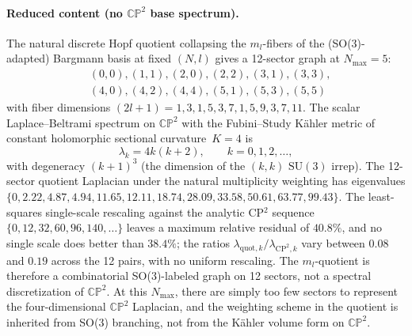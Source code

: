 \documentclass[twocolumn,pra,amsmath,amssymb,superscriptaddress]{revtex4-2}
\begin{document}
\paragraph{Reduced content (no $\mathbb{CP}^2$ base spectrum).}
The natural discrete Hopf quotient collapsing the $m_l$-fibers of
the (SO(3)-adapted) Bargmann basis at fixed $(N, l)$ gives a
12-sector graph at $N_{\max} = 5$:
\[
\begin{aligned}
& (0,0), (1,1), (2,0), (2,2), (3,1), (3,3), \\
& (4,0), (4,2), (4,4), (5,1), (5,3), (5,5)
\end{aligned}
\]
with fiber dimensions $(2l+1) = 1, 3, 1, 5, 3, 7, 1, 5, 9, 3, 7, 11$.
The scalar Laplace--Beltrami spectrum on $\mathbb{CP}^2$ with the
Fubini--Study K\"ahler metric of constant holomorphic sectional
curvature~$K = 4$ is~\cite{berger_gauduchon_mazet}
\begin{equation}
  \lambda_k = 4k(k+2),\qquad k = 0, 1, 2, \ldots,
\end{equation}
with degeneracy $(k+1)^3$ (the dimension of the $(k, k)$
$\mathrm{SU}(3)$ irrep).  The 12-sector quotient Laplacian under
the natural multiplicity weighting has eigenvalues
$\{0, 2.22, 4.87, 4.94, 11.65, 12.11, 18.74, 28.09, 33.58, 50.61,
63.77, 99.43\}$.  The least-squares single-scale rescaling against the
analytic CP$^2$ sequence $\{0, 12, 32, 60, 96, 140, \ldots\}$ leaves
a maximum relative residual of $40.8\%$, and no single scale does
better than $38.4\%$; the ratios
$\lambda_{\mathrm{quot},k}/\lambda_{\mathrm{CP}^2,k}$ vary between
$0.08$ and $0.19$ across the 12 pairs, with no uniform rescaling.
The $m_l$-quotient is therefore a combinatorial SO(3)-labeled graph
on 12 sectors, not a spectral discretization of $\mathbb{CP}^2$.
At this $N_{\max}$, there are simply too few sectors to represent
the four-dimensional $\mathbb{CP}^2$ Laplacian, and the weighting
scheme in the quotient is inherited from SO(3) branching, not from
the K\"ahler volume form on $\mathbb{CP}^2$.
\end{document}
